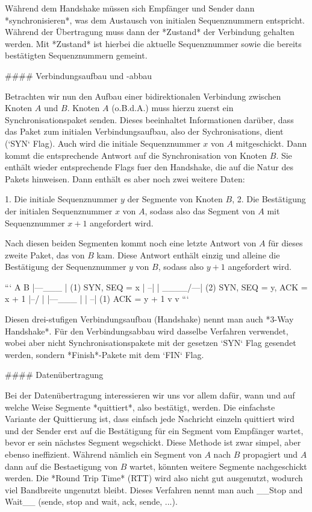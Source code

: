 Während dem Handshake müssen sich Empfänger und Sender dann *synchronisieren*,
was dem Austausch von initialen Sequenznummern entspricht. Während der
Übertragung muss dann der *Zustand* der Verbindung gehalten werden. Mit
*Zustand* ist hierbei die aktuelle Sequenznummer sowie die bereits bestätigten
Sequenznummern gemeint.

#### Verbindungsaufbau und -abbau

Betrachten wir nun den Aufbau einer bidirektionalen Verbindung zwischen Knoten
$A$ und $B$. Knoten $A$ (o.B.d.A.) muss hierzu zuerst ein Synchronisationspaket
senden. Dieses beeinhaltet Informationen darüber, dass das Paket zum initialen
Verbindungsaufbau, also der Sychronisations, dient (`SYN` Flag). Auch wird die
initiale Sequenznummer $x$ von $A$ mitgeschickt. Dann kommt die entsprechende
Antwort auf die Synchronisation von Knoten $B$. Sie enthält wieder entsprechende
Flags fuer den Handshake, die auf die Natur des Pakets hinweisen. Dann enthält
es aber noch zwei weitere Daten:

1. Die initiale Sequenznummer $y$ der Segmente von Knoten $B$,
2. Die Bestätigung der initialen Sequenznummer $x$ von $A$, sodass also das
   Segment von $A$ mit Sequenznummer $x + 1$ angefordert wird.

Nach diesen beiden Segmenten kommt noch eine letzte Antwort von $A$ für dieses
zweite Paket, das von $B$ kam. Diese Antwort enthält einzig und alleine die
Bestätigung der Sequenznummer $y$ von $B$, sodass also $y + 1$ angefordert wird.

```
A           B
|---\___    | (1) SYN, SEQ = x
|       \---|
|   ____/---| (2) SYN, SEQ = y, ACK = x + 1
|--/        |
|---\___    |
|       \---| (1) ACK = y + 1
v           v
```

Diesen drei-stufigen Verbindungsaufbau (Handshake) nennt man auch *3-Way
Handshake*. Für den Verbindungsabbau wird dasselbe Verfahren verwendet, wobei
aber nicht Synchronisationspakete mit der gesetzen `SYN` Flag gesendet werden,
sondern *Finish*-Pakete mit dem `FIN` Flag.

#### Datenübertragung

Bei der Datenübertragung interessieren wir uns vor allem dafür, wann und auf
welche Weise Segmente *quittiert*, also bestätigt, werden. Die einfachste
Variante der Quittierung ist, dass einfach jede Nachricht einzeln quittiert wird
und der Sender erst auf die Bestätigung für ein Segment vom Empfänger wartet,
bevor er sein nächstes Segment wegschickt. Diese Methode ist zwar simpel, aber
ebenso ineffizient. Während nämlich ein Segment von $A$ nach $B$ propagiert und
$A$ dann auf die Bestaetigung von $B$ wartet, könnten weitere Segmente
nachgeschickt werden. Die *Round Trip Time* (RTT) wird also nicht gut
ausgenutzt, wodurch viel Bandbreite ungenutzt bleibt. Dieses Verfahren nennt man
auch __Stop and Wait__ (sende, stop and wait, ack, sende, ...).

